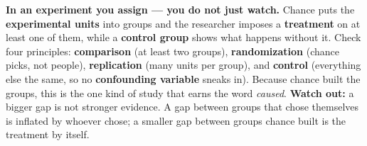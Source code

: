 \documentclass[12pt]{article}
\begin{document}
\vspace{0.14in}

\begin{remindbox}
\small
\textbf{In an experiment you assign --- you do not just watch.} Chance puts the
\textbf{experimental units} into groups and the researcher imposes a \textbf{treatment}
on at least one of them, while a \textbf{control group} shows what happens without it.
Check four principles: \textbf{comparison} (at least two groups), \textbf{randomization}
(chance picks, not people), \textbf{replication} (many units per group), and
\textbf{control} (everything else the same, so no \textbf{confounding variable} sneaks in).
Because chance built the groups, this is the one kind of study that earns the word
\emph{caused}. \textbf{Watch out:} a bigger gap is not stronger evidence. A gap between
groups that chose themselves is inflated by whoever chose; a smaller gap between groups
chance built is the treatment by itself.
\end{remindbox}
\end{document}
